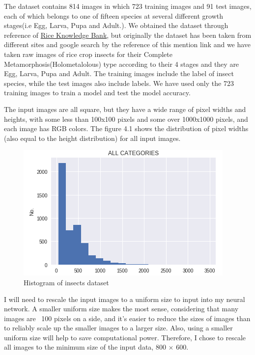 The dataset contains 814 images in which 723 training images and 91 test images, each of which belongs to one of fifteen species at several different growth stages(i.e Egg, Larva, Pupa and Adult.). We obtained the dataset through reference of  \href{http://www.knowledgebank.irri.org/step-by-step-production/growth/pests-and-diseases/insects}{Rice Knowledge Bank}, but originally the dataset has been taken from different sites and google search by the reference of this mention link and we have taken raw images of rice crop insects for their Complete Metamorphosis(Holometalolous) type according to their 4 stages and they are Egg, Larva, Pupa and Adult. The training images include the label of insect species, while the test images also include labels. We have used only the 723 training images to train a model and test the model accuracy.  

The input images are all square, but they have a wide range of pixel widths and heights, with some less than 100x100 pixels and some over 1000x1000 pixels, and each image has RGB colors. The figure 4.1 shows the distribution of pixel widths (also equal to the height distribution) for all input images. 



\begin{figure}
	\centering
	\includegraphics[width=0.7\linewidth]{img8}
	\caption{Histogram of insects dataset}
	\label{fig:img8}
\end{figure}


 I will need to rescale the input images to a uniform size to input into my neural network. A smaller uniform size makes the most sense, considering that many images are ~100 pixels on a side, and it’s easier to reduce the sizes of images than to reliably scale up the smaller images to a larger size. Also, using a smaller uniform size will help to save computational power. Therefore, I chose to rescale all images to the minimum size of the input data, 800 $\times$ 600.
 
